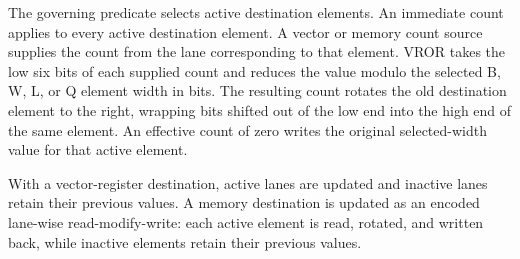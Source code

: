 The governing predicate selects active destination elements. An immediate
count applies to every active destination element. A vector or
memory count source supplies the count from the lane corresponding to that
element. VROR takes the low six bits of each supplied count and reduces the
value modulo the selected B, W, L, or Q element width in bits. The resulting
count rotates the old destination element to the right, wrapping bits shifted
out of the low end into the high end of the same element. An effective count of
zero writes the original selected-width value for that active element.

With a vector-register destination, active lanes are updated and inactive lanes
retain their previous values. A memory destination is updated as an encoded
lane-wise read-modify-write: each active element is read, rotated, and written
back, while inactive elements retain their previous values.
